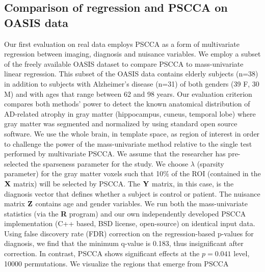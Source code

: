 \documentclass{llncs}
\newcommand{\X}{{\bf X}}
\newcommand{\Y}{{\bf Y}}
\newcommand{\Z}{{\bf Z}}
\begin{document}
\vspace{-0.1in}


\subsection{Comparison of regression and PSCCA on OASIS data}
Our first evaluation on real data employs PSCCA as a form of
multivariate regression between imaging, diagnosis and nuisance variables.  
We employ a subset of the freely available OASIS dataset to compare
PSCCA to mass-univariate linear regression.  This subset of the OASIS
data contains elderly subjects (n=38) in addition to subjects with
Alzheimer's disease (n=31) of both genders (39 F, 30 M) and with ages
that range between 62 and 98 years.  Our evaluation criterion compares
both methods' power to detect the known anatomical distribution of
AD-related atrophy in gray matter (hippocampus, cuneus, temporal lobe)
\cite{Avants2010b} where gray matter was segmented and normalized by using standard
open source software.  We use the whole brain, in template space, as region of interest in order to
challenge the power of the mass-univariate method relative to the
single test performed by multivariate PSCCA.  We assume that the
researcher has pre-selected the sparseness parameter for the study.
We choose $\lambda$ (sparsity parameter) for the gray matter voxels such that 10\% of the
ROI (contained in the $\X$ matrix) will be selected by PSCCA.  The
$\Y$ matrix, in this case, is the diagnosis vector that defines
whether a subject is control or patient.  The nuisance matrix $\Z$
contains age and gender variables.  We run both the mass-univariate
statistics (via the {\bf R} program) and our own independently
developed PSCCA implementation (C++ based, BSD license, open-source)
on identical input data.  Using false discovery rate (FDR) correction
on the regression-based p-values for diagnosis, we find that the
minimum q-value is 0.183, thus insignificant after correction.  In
contrast, PSCCA shows significant effects at the $p=0.041$ level,
10000 permutations.  We visualize the regions that emerge from PSCCA
\end{document}
